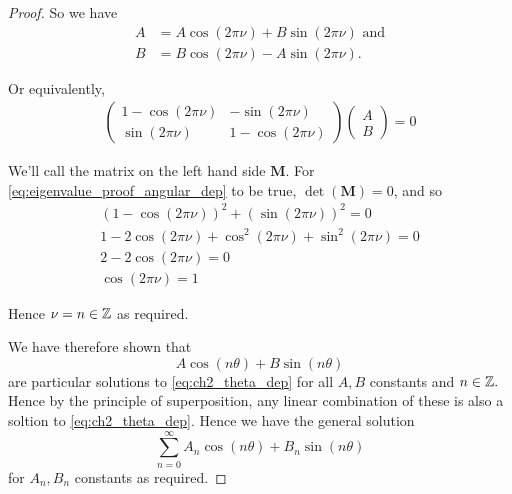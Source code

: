 \begin{proof}
  So we have
  \begin{align*}
    A &= A\cos(2\pi\nu) + B\sin(2\pi\nu) \text{ and}\\
    B &= B\cos(2\pi\nu) - A\sin(2\pi\nu).
  \end{align*}\par
  Or equivalently,
  \begin{align}\label{eq:eigenvalue_proof_angular_dep}
    \begin{pmatrix}
      1 - \cos(2\pi\nu) & -\sin(2\pi\nu)\\
      \sin(2\pi\nu) & 1 - \cos(2\pi\nu)
    \end{pmatrix}
    \begin{pmatrix}
      A\\
      B
    \end{pmatrix}
    = 0
  \end{align}\par
  We'll call the matrix on the left hand side $\mathbf{M}$. For \eqref{eq:eigenvalue_proof_angular_dep} to be true, $\det(\mathbf{M}) = 0$, and so
  \begin{gather*}
    (1 - \cos(2\pi\nu))^2 + (\sin(2\pi\nu))^2 = 0 \\
    1 - 2\cos(2\pi\nu) + \cos^2(2\pi\nu) + \sin^2(2\pi\nu) = 0 \\
    2 - 2\cos(2\pi\nu) = 0 \\
    \cos(2\pi\nu) = 1
  \end{gather*}\par
  Hence $\nu = n \in \mathbb{Z}$ as required. \par
  We have therefore shown that
  \begin{equation}
    A \cos(n\theta) + B \sin(n \theta)
  \end{equation}
  are particular solutions to \eqref{eq:ch2_theta_dep} for all $A, B$ constants and $n \in \mathbb{Z}.$ Hence by the principle of superposition, any linear combination of these is also a soltion to \eqref{eq:ch2_theta_dep}. Hence we have the general solution
  \begin{equation*}
    \sum_{n=0}^\infty A_n \cos(n\theta) + B_n \sin(n \theta)
  \end{equation*}
  for $A_n, B_n$ constants as required.
\end{proof}

